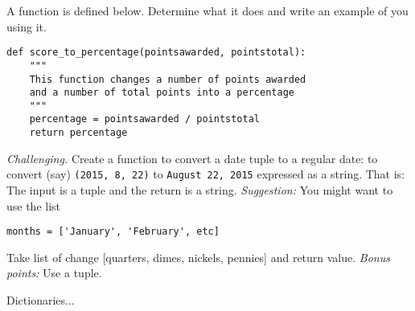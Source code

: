 \documentclass[11pt]{exam}
\begin{document}
\begin{questions}
\item A function is defined below. Determine what it does and write an example of you using it.
\begin{verbatim}
def score_to_percentage(pointsawarded, pointstotal):
    """
    This function changes a number of points awarded
    and a number of total points into a percentage
    """
    percentage = pointsawarded / pointstotal
    return percentage
\end{verbatim}

\item {\it Challenging.\/}
Create a function to convert a date tuple to a regular date:
to convert (say) \texttt{(2015, 8, 22)} to \texttt{August 22, 2015} expressed as a string.
That is:  The input is a tuple and the return is a string.
{\it Suggestion:\/} You might want to use the list
\begin{verbatim}
months = ['January', 'February', etc]
\end{verbatim}

\item Take list of change [quarters, dimes, nickels, pennies] and return value.
{\it Bonus points:\/} Use a tuple.


\item Dictionaries... 

\end{questions}
\end{document}
